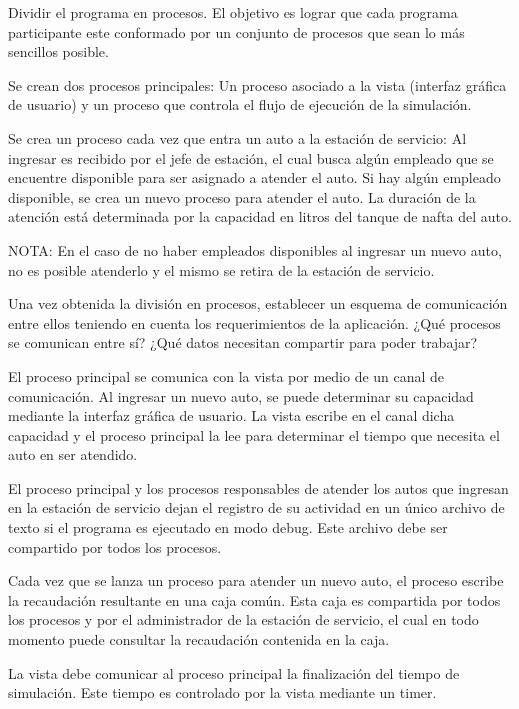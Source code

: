 \documentclass[12pt,a4paper,titlepage,oneside]{article}
\renewenvironment{itemize}{
 \begin{list}{}{
  \setlength{\leftmargin}{1.5em}
 }
}{
 \end{list}
}
\begin{document}
\begin{enumerate}
\item Dividir el programa en procesos. El objetivo es lograr que cada programa participante este conformado por un conjunto de procesos que sean lo más sencillos posible.

\begin{itemize}
\item[•] Se crean dos procesos principales: Un proceso asociado a la vista (interfaz gráfica de usuario) y un proceso que controla el flujo de ejecución de la simulación.
\item[•] Se crea un proceso cada vez que entra un auto a la estación de servicio: Al ingresar es recibido por el jefe de estación, el cual busca algún empleado que se encuentre disponible para ser asignado a atender el auto. Si hay algún empleado disponible, se crea un nuevo proceso para atender el auto. La duración de la atención está determinada por la capacidad en litros del tanque de nafta del auto.
\end{itemize}

NOTA: En el caso de no haber empleados disponibles al ingresar un nuevo auto, no es posible atenderlo y el mismo se retira de la estación de servicio.

\item Una vez obtenida la división en procesos, establecer un esquema de comunicación entre ellos teniendo en cuenta los requerimientos de la aplicación. ¿Qué procesos se comunican entre sí? ¿Qué datos necesitan compartir para poder trabajar?

\begin{itemize}
\item[•] El proceso principal se comunica con la vista por medio de un canal de comunicación. Al ingresar un nuevo auto, se puede determinar su capacidad mediante la interfaz gráfica de usuario. La vista escribe en el canal dicha capacidad y el proceso principal la lee para determinar el tiempo que necesita el auto en ser atendido.
\item[•] El proceso principal y los procesos responsables de atender los autos que ingresan en la estación de servicio dejan el registro de su actividad en un único archivo de texto si el programa es ejecutado en modo debug. Este archivo debe ser compartido por todos los procesos.
\item[•] Cada vez que se lanza un proceso para atender un nuevo auto, el proceso escribe la recaudación resultante en una caja común. Esta caja es compartida por todos los procesos y por el administrador de la estación de servicio, el cual en todo momento puede consultar la recaudación contenida en la caja.
\item[•] La vista debe comunicar al proceso principal la finalización del tiempo de simulación. Este tiempo es controlado por la vista mediante un timer.
\end{itemize}


\end{enumerate}
\end{document}
